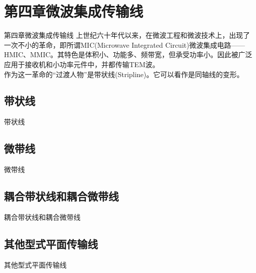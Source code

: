 \section{第四章\quad 微波集成传输线}
\begin{frame}{第四章\quad 微波集成传输线}
  上世纪六十年代以来，在微波工程和微波技术上，出现了一次不小的革命，即所谓MIC(Microwave Integrated Circuit)微波集成电路——HMIC、MMIC。其特色是体积小、功能多、频带宽，但承受功率小。因此被广泛应用于接收机和小功率元件中，并都传输TEM波。\\
  作为这一革命的“过渡人物”是带状线(Stripline)。它可以看作是同轴线的变形。
\end{frame}

\subsection{带状线}
\begin{frame}{带状线}

\end{frame}

\subsection{微带线}
\begin{frame}{微带线}

\end{frame}

\subsection{耦合带状线和耦合微带线}
\begin{frame}{耦合带状线和耦合微带线}

\end{frame}

\subsection{其他型式平面传输线}
\begin{frame}{其他型式平面传输线}

\end{frame}
